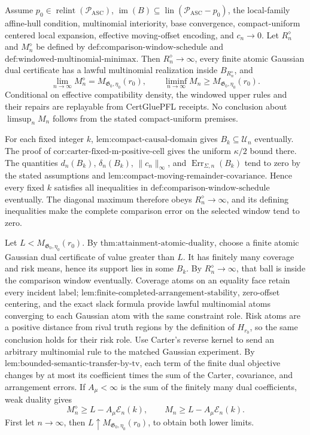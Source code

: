 Assume \(p_0\in\operatorname{relint}(\mathcal P_{\mathrm{ASC}})\), \(\operatorname{im}(B)\subseteq\operatorname{lin}(\mathcal P_{\mathrm{ASC}}-p_0)\), the local-family affine-hull condition, multinomial interiority, base convergence, compact-uniform centered local expansion, effective moving-offset encoding, and \(c_n\to0\). Let \(R_n^{\diamond}\) and \(M_n^{\diamond}\) be defined by \(\text{def:comparison-window-schedule}\) and \(\text{def:windowed-multinomial-minimax}\). Then \(R_n^{\diamond}\to\infty\), every finite atomic Gaussian dual certificate has a lawful multinomial realization inside \(B_{R_n^{\diamond}}\), and
\[
 \lim_{n\to\infty}M_n^{\diamond}
 =M_{\mathfrak G_0,\eta_0}(r_0),
 \qquad
 \liminf_{n\to\infty}M_n
 \ge M_{\mathfrak G_0,\eta_0}(r_0).
\]
Conditional on effective compatibility density, the windowed upper rules and their repairs are replayable from CertGluePFL receipts. No conclusion about \(\limsup_nM_n\) follows from the stated compact-uniform premises.

For each fixed integer \(k\), \(\text{lem:compact-causal-domain}\) gives \(B_k\subseteq\mathcal U_n\) eventually. The proof of \(\text{cor:carter-fixed-m-positive-cell}\) gives the uniform \(\kappa/2\) bound there. The quantities \(d_n(B_k)\), \(\delta_n(B_k)\), \(\|c_n\|_\infty\), and \(\operatorname{Err}_{\Sigma,n}(B_k)\) tend to zero by the stated assumptions and \(\text{lem:compact-moving-remainder-covariance}\). Hence every fixed \(k\) satisfies all inequalities in \(\text{def:comparison-window-schedule}\) eventually. The diagonal maximum therefore obeys \(R_n^{\diamond}\to\infty\), and its defining inequalities make the complete comparison error on the selected window tend to zero.

Let \(L<M_{\mathfrak G_0,\eta_0}(r_0)\). By \(\text{thm:attainment-atomic-duality}\), choose a finite atomic Gaussian dual certificate of value greater than \(L\). It has finitely many coverage and risk means, hence its support lies in some \(B_k\). By \(R_n^{\diamond}\to\infty\), that ball is inside the comparison window eventually. Coverage atoms on an equality face retain every incident label; \(\text{lem:finite-completed-arrangement-stability}\), zero-offset centering, and the exact slack formula provide lawful multinomial atoms converging to each Gaussian atom with the same constraint role. Risk atoms are a positive distance from rival truth regions by the definition of \(H_{r_0}\), so the same conclusion holds for their risk role. Use Carter's reverse kernel to send an arbitrary multinomial rule to the matched Gaussian experiment. By \(\text{lem:bounded-semantic-transfer-by-tv}\), each term of the finite dual objective changes by at most its coefficient times the sum of the Carter, covariance, and arrangement errors. If \(A_\mu<\infty\) is the sum of the finitely many dual coefficients, weak duality gives
\[
 M_n^{\diamond}\ge L-A_\mu\mathscr E_n(k),
 \qquad
 M_n\ge L-A_\mu\mathscr E_n(k).
\]
First let \(n\to\infty\), then \(L\uparrow M_{\mathfrak G_0,\eta_0}(r_0)\), to obtain both lower limits.

